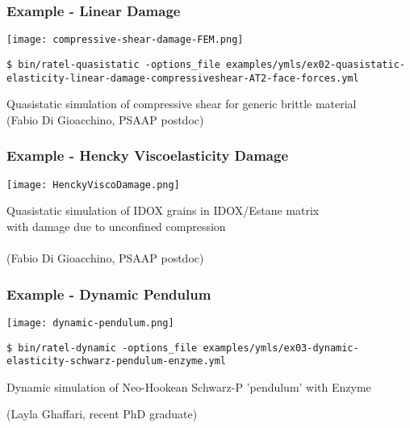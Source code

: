 \documentclass{beamer}
\begin{document}

\begin{frame}[fragile]
\begin{center}
\frametitle{Example - Linear Damage}

\texttt{[image: compressive-shear-damage-FEM.png]}

{\tiny
\begin{lstlisting}
$ bin/ratel-quasistatic -options_file examples/ymls/ex02-quasistatic-elasticity-linear-damage-compressiveshear-AT2-face-forces.yml
\end{lstlisting}
}

Quasistatic simulation of compressive shear for generic brittle material\\


(Fabio Di Gioacchino, PSAAP postdoc)

\end{center}
\end{frame}


\begin{frame}[fragile]
\begin{center}
\frametitle{Example - Hencky Viscoelasticity Damage}

\texttt{[image: HenckyViscoDamage.png]}

Quasistatic simulation of IDOX grains in IDOX/Estane matrix\\
with damage due to unconfined compression\\

~\\

(Fabio Di Gioacchino, PSAAP postdoc)

\end{center}
\end{frame}


\begin{frame}[fragile]
\begin{center}
\frametitle{Example - Dynamic Pendulum}

\texttt{[image: dynamic-pendulum.png]}

{\tiny
\begin{lstlisting}
$ bin/ratel-dynamic -options_file examples/ymls/ex03-dynamic-elasticity-schwarz-pendulum-enzyme.yml
\end{lstlisting}
}

Dynamic simulation of Neo-Hookean Schwarz-P 'pendulum' with Enzyme

(Layla Ghaffari, recent PhD graduate)

\end{center}
\end{frame}
\end{document}
